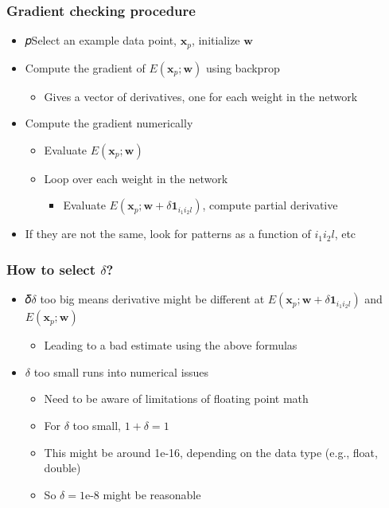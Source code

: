 \documentclass[12pt,notes,mathserif]{beamer}
\begin{document}
\begin{frame}[c]
	\frametitle{Gradient checking procedure}
	\begin{itemize}
		\item 𝑝Select an example data point, $\mathbf{x}_p$, initialize $\mathbf{w}$
		\item Compute the gradient of $E(\mathbf{x}_p;\mathbf{w})$ using backprop
		      \begin{itemize}
			      \item Gives a vector of derivatives, one for each weight in the network
		      \end{itemize}
		\item Compute the gradient numerically
		      \begin{itemize}
			      \item Evaluate $E(\mathbf{x}_p;\mathbf{w})$
			      \item Loop over each weight in the network
			            \begin{itemize}
				            \item Evaluate $E(\mathbf{x}_p;\mathbf{w}+\delta \mathbf{1}_{i_1i_2l})$, compute partial derivative
			            \end{itemize}
		      \end{itemize}
		\item If they are not the same, look for patterns as a
		      function of $i_1i_2l$, etc
	\end{itemize}
\end{frame}

\begin{frame}[c]
	\frametitle{How to select $\delta$?}
	\begin{itemize}
		\item 𝛿$\delta$ too big means derivative might be different at $E(\mathbf{x}_p;\mathbf{w}+\delta \mathbf{1}_{i_1i_2l})$ and $E(\mathbf{x}_p;\mathbf{w})$
		      \begin{itemize}
			      \item Leading to a bad estimate using the above formulas
		      \end{itemize}
		\item $\delta$ too small runs into numerical issues
		      \begin{itemize}
			      \item Need to be aware of limitations of floating point math
			      \item For $\delta$ too small, $1+\delta =1$
			      \item This might be around 1e-16, depending on the data type (e.g., float, double)
			      \item So $\delta= 1$e-8 might be reasonable
		      \end{itemize}
	\end{itemize}
\end{frame}
\end{document}
